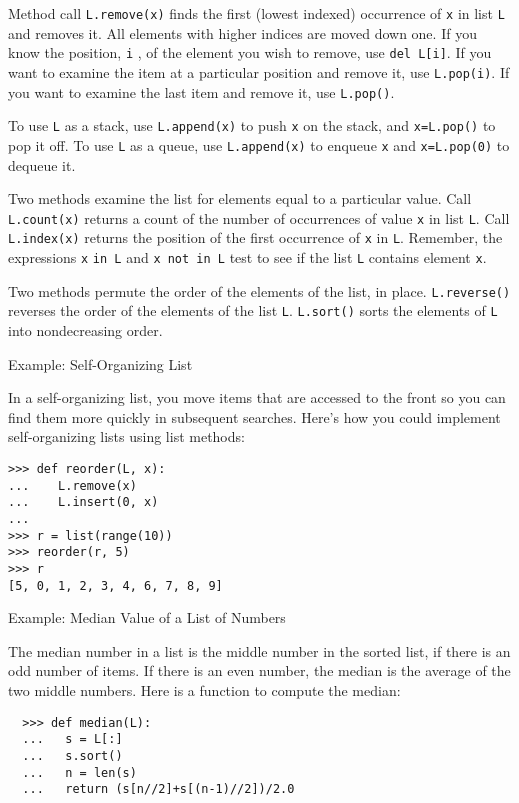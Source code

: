 Method call \texttt{L.remove(x)} finds the first (lowest indexed) occurrence of \texttt{x} in list \texttt{L}
and removes it. All elements with higher indices are moved down one. If
you know the position, \texttt{i} , of the element you wish to remove, use
\texttt{del L{[}i{]}}. If you want to examine the item at a particular
position and remove it, use \texttt{L.pop(i)}. If you want to examine the
last item and remove it, use \texttt{L.pop()}.

To use \texttt{L} as a stack, use
\texttt{L.append(x)} to push \texttt{x} on the stack, and \texttt{x=L.pop()}
to pop it off. To use \texttt{L} as a queue, use \texttt{L.append(x)} to
enqueue \texttt{x} and \texttt{x=L.pop(0)} to dequeue it.

Two methods examine the list for
elements equal to a particular value. Call \texttt{L.count(x)} returns a
count of the number of occurrences of value \texttt{x} in list \texttt{L}.
Call \texttt{L.index(x)} returns the position of the first occurrence of
\texttt{x} in \texttt{L}. Remember, the expressions \texttt{x} \texttt{in L}
and \texttt{x not in L} test to see if the list \texttt{L} contains element
\texttt{x}.

Two methods permute the order of
the elements of the list, in place. \texttt{L.reverse()} reverses the
order of the elements of the list \texttt{L}. \texttt{L.sort()} sorts the
elements of \texttt{L} into nondecreasing order.

Example: Self-Organizing List

In a self-organizing list, you move
items that are accessed to the front so you can find them more quickly
in subsequent searches. Here's how you could implement self-organizing
lists using list methods:


\begin{verbatim}
>>> def reorder(L, x):
...    L.remove(x)
...    L.insert(0, x)
...
>>> r = list(range(10))
>>> reorder(r, 5)
>>> r
[5, 0, 1, 2, 3, 4, 6, 7, 8, 9]
\end{verbatim}

Example: Median Value of a List of
Numbers


The median number in a list is the middle number in the sorted list, if there is an odd number of items. If
there is an even number, the median is the average of the two middle numbers. Here is a function to compute the median:

\begin{verbatim}
  >>> def median(L):
  ...   s = L[:]
  ...   s.sort()
  ...   n = len(s)
  ...   return (s[n//2]+s[(n-1)//2])/2.0
  \end{verbatim}
  

